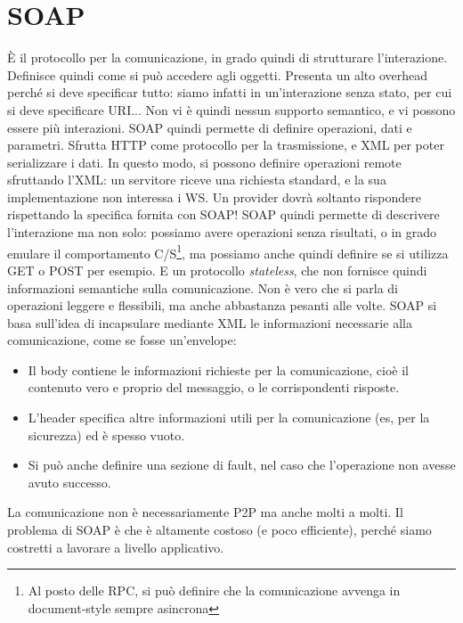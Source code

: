 \section{SOAP}
È il protocollo per la comunicazione, in grado quindi di strutturare l'interazione.
Definisce quindi come si può accedere agli oggetti. Presenta un alto overhead perché si deve specificar tutto: siamo
infatti in un'interazione senza stato, per cui si deve specificare URI... Non vi è quindi nessun supporto semantico,
e vi possono essere più interazioni.
SOAP quindi permette di definire operazioni, dati e parametri. Sfrutta HTTP come protocollo per la trasmissione, e XML
per poter serializzare i dati.
In questo modo, si possono definire operazioni remote sfruttando l'XML: un servitore riceve una richiesta standard, e
la sua implementazione non interessa i WS. Un provider dovrà soltanto rispondere rispettando la specifica fornita con
SOAP! SOAP quindi permette di descrivere l'interazione ma non solo: possiamo avere operazioni senza risultati, o in
grado emulare il comportamento C/S\footnote{Al posto delle RPC, si può definire che la comunicazione avvenga in document-style sempre asincrona}, ma possiamo anche quindi definire se si
utilizza GET o POST per esempio. E un protocollo \textit{stateless}, che non fornisce quindi informazioni semantiche
sulla comunicazione. Non è vero che si parla di operazioni leggere e flessibili, ma anche abbastanza pesanti alle volte.
SOAP si basa sull'idea di incapsulare mediante XML le informazioni necessarie alla comunicazione, come se fosse
un'envelope:
\begin{itemize}
 \item Il body contiene le informazioni richieste per la comunicazione, cioè il contenuto vero e proprio del
 messaggio, o le corrispondenti risposte.
 \item L'header specifica altre informazioni utili per la comunicazione (es, per la sicurezza) ed è spesso vuoto.
 \item Si può anche definire una sezione di fault, nel caso che l'operazione non avesse avuto successo.
\end{itemize}
La comunicazione non è necessariamente P2P ma anche molti a molti. Il problema di SOAP è che è altamente costoso (e
poco efficiente), perché siamo costretti a lavorare a livello applicativo.
